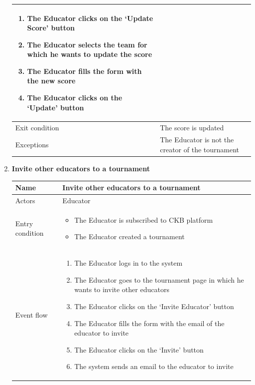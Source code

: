 \begin{enumerate}[label=UC\arabic*:]
\begin{tabular}{|p{3cm}|p{8cm}|}
\begin{enumerate}[label=\arabic*.]
            \item The Educator clicks on the `Update Score' button
            \item The Educator selects the team for which he wants to update the score
            \item The Educator fills the form with the new score
            \item The Educator clicks on the `Update' button
        \end{enumerate}
        \\
        \hline
        Exit condition & The score is updated \\
        \hline
        Exceptions & The Educator is not the creator of the tournament \\
        \hline
    \end{tabular}
    \item \textbf{Invite other educators to a tournament} \\
    \begin{tabular}{|p{3cm}|p{8cm}|}
        \hline
        Name & Invite other educators to a tournament \\
        \hline
        Actors & Educator \\
        \hline
        Entry condition &
        \begin{itemize}
            \item The Educator is subscribed to CKB platform
            \item The Educator created a tournament
        \end{itemize}
        \\
        \hline
        Event flow & 
        \begin{enumerate}[label=\arabic*.]
            \item The Educator logs in to the system
            \item The Educator goes to the tournament page in which he wants to invite other educators
            \item The Educator clicks on the `Invite Educator' button
            \item The Educator fills the form with the email of the educator to invite
            \item The Educator clicks on the `Invite' button
            \item The system sends an email to the educator to invite
        \end{enumerate}
        \\

\end{tabular}
\end{enumerate}
